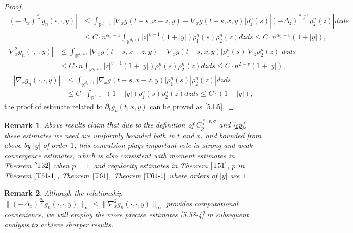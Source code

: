 \documentclass[11pt,reqno]{amsart}
\newtheorem{remark}{\indent Remark}[section]
\numberwithin{equation}{section}
\begin{document}
\begin{proof}
\begin{equation}
\begin{split}
	|(-\Delta_{x})^{\frac{\alpha_{1}}{2}}g_{n}(\cdot,\cdot,y)|&\leq \int_{\mathbb{R}^{ d_{1}+1}}	|\nabla_{x}g(t-s,x-z,y)-\nabla_{x}g(t-s,x,y)|\rho_{1}^{n}(s)|(-\Delta_{z})^{\frac{\alpha_{1}-1}{2}}\rho_{2}^{n}(z)|dzds\\
	&\leq C\cdot n^{\alpha_{1}-1}\int_{\mathbb{R}^{ d_{1}+1}}	|z|^{v-1}(1+|y|)\rho_{1}^{n}(s)\rho_{2}^{n}(z)dzds\leq C\cdot n^{\alpha_{1}-v}(1+|y|),
\end{split}\nonumber
\end{equation}
\begin{equation}
	\begin{split}
		|\nabla_{x}^{2}g_{n}(\cdot,\cdot,y)|&\leq \int_{\mathbb{R}^{ d_{1}+1}}	|\nabla_{x}g(t-s,x-z,y)-\nabla_{x}g(t-s,x,y)|\rho_{1}^{n}(s)|\nabla_{z}\rho_{2}^{n}(z)|dzds\\
		&\leq C\cdot n\int_{\mathbb{R}^{ d_{1}+1}}	|z|^{v-1}(1+|y|)\rho_{1}^{n}(s)\rho_{2}^{n}(z)dzds\leq C\cdot n^{2-v}(1+|y|),
	\end{split}\nonumber
\end{equation}
\begin{equation}\label{5.58-32}
	\begin{split}
		|\nabla_{x}g_{n}(\cdot,\cdot,y)|&\leq \int_{\mathbb{R}^{ d_{1}+1}}	|\nabla_{x}g(t-s,x-z,y)|\rho_{1}^{n}(s)|\rho_{2}^{n}(z)|dzds\\
		&\leq C\cdot \int_{\mathbb{R}^{ d_{1}+1}}	(1+|y|)\rho_{1}^{n}(s)\rho_{2}^{n}(z)dzds\leq C\cdot (1+|y|),
	\end{split}
\end{equation}
the proof of estimate related to $\partial_{t}g_{n}(t,x,y)$ can be proved as \eqref{5.L5}.
\end{proof}
\begin{remark}
 Above results claim that due to the definition of $C_{p}^{\frac{v}{\alpha_{1}}, v,\sigma }$ and \eqref{cp}, these estimates we need are uniformly bounded  both in $t$ and $x$, and  bounded from above by $|y|$ of order $1$, this conculsion plays important role in strong and weak convergence estimates, which is also consistent with moment estimates in Theorem $\ref{T32}$ when $p=1$, and regularity estimates in Theorem $\ref{T51}$, $p$ in Theorem $\ref{T51-1}$, Theorem $\ref{T61}$, Theorem $\ref{T61-1}$ where orders of $|y|$ are $1$.
\end{remark}

\begin{remark}
Although the relationship $	\|(-\Delta_{x})^{\frac{\alpha_{1}}{2}}g_{n}(\cdot,\cdot,y)\|_{\infty}\leq \|\nabla_{x}^{2}g_{n}(\cdot,\cdot,y)\|_{\infty}$ provides computational convenience, we will employ the more precise estimates \eqref{5.58-4} in subsequent analysis to achieve sharper results.
\end{remark}
\end{document}
